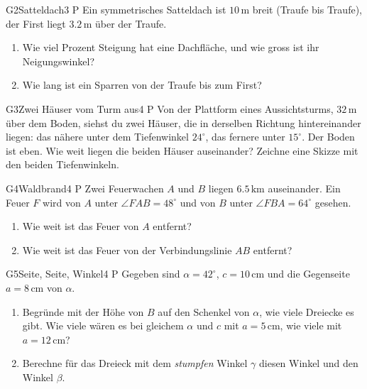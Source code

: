 \documentclass[11pt]{article}
\begin{document}
\begin{lpaufgabe}{G2}{Satteldach}{3 P}
Ein symmetrisches Satteldach ist $10\,\text{m}$ breit (Traufe bis Traufe), der First liegt $3.2\,\text{m}$ über der Traufe.
\begin{enumerate}[label=(\alph*),leftmargin=*,itemsep=2pt]
\item Wie viel Prozent Steigung hat eine Dachfläche, und wie gross ist ihr Neigungswinkel?
\item Wie lang ist ein Sparren von der Traufe bis zum First?
\end{enumerate}
\end{lpaufgabe}

\begin{lpaufgabe}{G3}{Zwei Häuser vom Turm aus}{4 P}
Von der Plattform eines Aussichtsturms, $32\,\text{m}$ über dem Boden, siehst du zwei Häuser, die in derselben Richtung
hintereinander liegen: das nähere unter dem Tiefenwinkel $24^\circ$, das fernere unter $15^\circ$. Der Boden ist eben.
Wie weit liegen die beiden Häuser auseinander? Zeichne eine Skizze mit den beiden Tiefenwinkeln.
\end{lpaufgabe}


\begin{lpaufgabe}{G4}{Waldbrand}{4 P}
Zwei Feuerwachen $A$ und $B$ liegen $6.5\,\text{km}$ auseinander. Ein Feuer $F$ wird von $A$ unter $\angle FAB = 48^\circ$ und
von $B$ unter $\angle FBA = 64^\circ$ gesehen.
\begin{enumerate}[label=(\alph*),leftmargin=*,itemsep=2pt]
\item Wie weit ist das Feuer von $A$ entfernt?
\item Wie weit ist das Feuer von der Verbindungslinie $AB$ entfernt?
\end{enumerate}
\end{lpaufgabe}

\begin{lpaufgabe}{G5}{Seite, Seite, Winkel}{4 P}
Gegeben sind $\alpha = 42^\circ$, $c = 10\,\text{cm}$ und die Gegenseite $a = 8\,\text{cm}$ von $\alpha$.
\begin{enumerate}[label=(\alph*),leftmargin=*,itemsep=2pt]
\item Begründe mit der Höhe von $B$ auf den Schenkel von $\alpha$, wie viele Dreiecke es gibt. Wie viele wären es
  bei gleichem $\alpha$ und $c$ mit $a = 5\,\text{cm}$, wie viele mit $a = 12\,\text{cm}$?
\item Berechne für das Dreieck mit dem \emph{stumpfen} Winkel $\gamma$ diesen Winkel und den Winkel $\beta$.
\end{enumerate}
\end{lpaufgabe}
\end{document}

